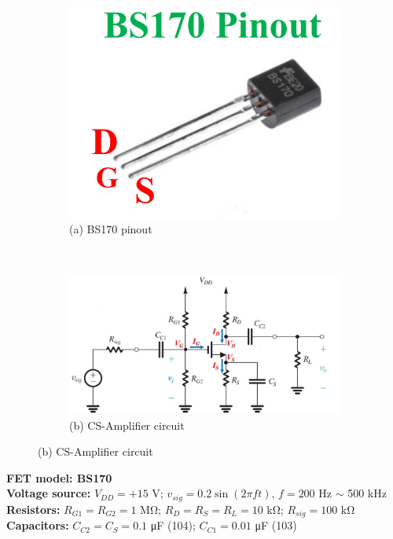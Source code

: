 \documentclass{article}
\begin{document}
\begin{CJK*}{UTF8}{bkai}
\begin{figure}[h]
\begin{center}
        \begin{subfigure}[b]{0.25\textwidth}
            \includegraphics[width=\textwidth]{BS170_pinout.jpg}
            \caption*{(a) BS170 pinout}
        \end{subfigure}
        ~
        \begin{subfigure}[b]{0.55\textwidth}
            \includegraphics[width=\textwidth]{cs_amp_circuit.jpg}
            \caption*{(b) CS-Amplifier circuit}
        \end{subfigure}
    \end{center}
\end{figure}

\textbf{FET model: BS170} \\
\textbf{Voltage source:} $V_{DD} = +15$ \unit{\volt}; $v_{sig} = 0.2 \sin(2 \pi f t)$, $f = 200$ \unit{\hertz} $\sim$ 500 \unit{\kilo\hertz}\\
\textbf{Resistors: }$R_{G1} = R_{G2} = 1$ \unit{\mega\ohm}; $R_D = R_S = R_L = 10$ \unit{\kilo\ohm}; $R_{sig} = 100$ \unit{\kilo\ohm}\\
\textbf{Capacitors: }$C_{C2} = C_S = 0.1$ \unit{\micro\farad} (104); $C_{C1} = 0.01$ \unit{\micro\farad} (103)\\


\end{CJK*}
\end{document}
